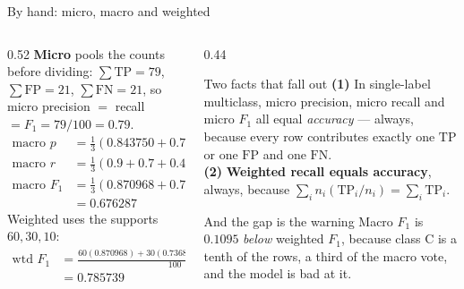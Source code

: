 \documentclass[aspectratio=169]{beamer}
\newcommand{\TP}{\mathrm{TP}}
\newcommand{\FP}{\mathrm{FP}}
\newcommand{\FN}{\mathrm{FN}}
\begin{document}
\begin{frame}[shrink=10]{By hand: micro, macro and weighted}
  \begin{columns}[T]
    \begin{column}{0.52\textwidth}
      \textbf{Micro} pools the counts before dividing:
      $\sum\TP = 79$, $\sum\FP = 21$, $\sum\FN = 21$, so micro precision
      $=$ recall $=F_1 = 79/100 = 0.79$.
      \begin{align*}
        \text{macro }p &= \tfrac{1}{3}(0.843750 + 0.777778 + 0.444444)
          = 0.688657\\
        \text{macro }r &= \tfrac{1}{3}(0.9 + 0.7 + 0.4) = 0.666667\\
        \text{macro }F_1 &= \tfrac{1}{3}(0.870968 + 0.736842 + 0.421053)\\
          &= 0.676287
      \end{align*}
      Weighted uses the supports $60, 30, 10$:
      \begin{align*}
        \text{wtd }F_1 &= \tfrac{60(0.870968) + 30(0.736842)
                                 + 10(0.421053)}{100}\\
                       &= 0.785739
      \end{align*}
    \end{column}
    \begin{column}{0.44\textwidth}
      \begin{block}{Two facts that fall out}
        \footnotesize \textbf{(1)} In single-label multiclass, micro precision,
        micro recall and micro $F_1$ all equal \emph{accuracy} --- always,
        because every row contributes exactly one $\TP$ or one $\FP$ and one
        $\FN$.\\[0.3em]
        \textbf{(2)} \textbf{Weighted recall equals accuracy}, always, because
        $\sum_i n_i(\TP_i/n_i) = \sum_i \TP_i$.
      \end{block}
      \begin{alertblock}{And the gap is the warning}
        \footnotesize Macro $F_1$ is $\mathbf{0.1095}$ \emph{below} weighted
        $F_1$, because class C is a tenth of the rows, a third of the macro
        vote, and the model is bad at it.
      \end{alertblock}
    \end{column}
  \end{columns}
\end{frame}
\end{document}
